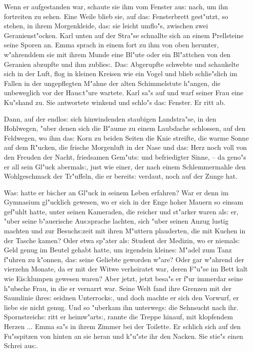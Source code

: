 \documentclass[oneside,12pt]{book}
\newcommand{\s}{s:}%
\begin{document}
Wenn er aufgestanden war, schaute sie ihm vom Fenster au{\s} nach,
um ihn fortreiten zu sehen. Eine Weile blieb sie, auf da{\s}
Fensterbrett gest"utzt, so stehen, in ihrem Morgenkleide, da{\s}
sie leicht umflo"s, zwischen zwei Geranienst"ocken. Karl unten auf
der Stra"se schnallte sich an einem Prellsteine seine Sporen an.
Emma sprach in einem fort zu ihm von oben herunter, w"ahrenddem
sie mit ihrem Munde eine Bl"ute oder ein Bl"attchen von den
Geranien abzupfte und ihm zublie{\s}. Da{\s} Abgerupfte schwebte
und schaukelte sich in der Luft, flog in kleinen Kreisen wie ein
Vogel und blieb schlie"slich im Fallen in der ungepflegten M"ahne
der alten Schimmelstute h"angen, die unbeweglich vor der
Hau{\s}t"ure wartete. Karl sa"s auf und warf seiner Frau eine
Ku"shand zu. Sie antwortete winkend und schlo"s da{\s} Fenster. Er
ritt ab.

Dann, auf der endlo{\s} sich hinwindenden staubigen Landstra"se,
in den Hohlwegen, "uber denen sich die B"aume zu einem Laubdache
schlossen, auf den Feldwegen, wo ihm da{\s} Korn zu beiden Seiten
die Knie streifte, die warme Sonne auf dem R"ucken, die frische
Morgenluft in der Nase und da{\s} Herz noch voll von den Freuden
der Nacht, friedsamen Gem"ut{\s} und befriedigter Sinne, -- da
geno"s er all sein Gl"uck abermal{\s}, just wie einer, der nach
einem Schlemmermahle den Wohlgeschmack der Tr"uffeln, die er
bereit{\s} verdaut, noch auf der Zunge hat.

Wa{\s} hatte er bi{\s}her an Gl"uck in seinem Leben erfahren? War
er denn im Gymnasium gl"ucklich gewesen, wo er sich in der Enge
hoher Mauern so einsam gef"uhlt hatte, unter seinen Kameraden, die
reicher und st"arker waren al{\s} er, "uber seine b"auerische
Au{\s}sprache lachten, sich "uber seinen Anzug lustig machten und
zur Besuch{\s}zeit mit ihren M"uttern plauderten, die mit Kuchen
in der Tasche kamen? Oder etwa sp"ater al{\s} Student der Medizin,
wo er niemal{\s} Geld genug im Beutel gehabt hatte, um irgendein
kleine{\s} M"adel zum Tanz f"uhren zu k"onnen, da{\s} seine
Geliebte geworden w"are? Oder gar w"ahrend der vierzehn Monate, da
er mit der Witwe verheiratet war, deren F"u"se im Bett kalt wie
Ei{\s}klumpen gewesen waren? Aber jetzt, jetzt besa"s er f"ur
immerdar seine h"ubsche Frau, in die er vernarrt war. Seine Welt
fand ihre Grenzen mit der Saumlinie ihre{\s} seidnen
Unterrock{\s}, und doch machte er sich den Vorwurf, er liebe sie
nicht genug. Und so "uberkam ihn unterweg{\s} die Sehnsucht nach
ihr. Spornstreich{\s} ritt er heimw"art{\s}, rannte die Treppe
hinauf, mit klopfendem Herzen ... Emma sa"s in ihrem Zimmer bei
der Toilette. Er schlich sich auf den Fu"sspitzen von hinten an
sie heran und k"u"ste ihr den Nacken. Sie stie"s einen Schrei
au{\s}.
\end{document}

